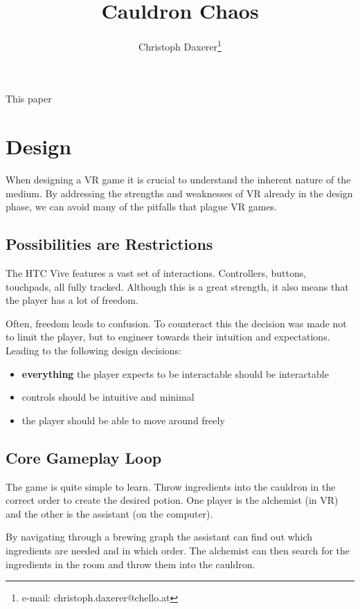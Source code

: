 \documentclass{vgtc}
\title{Cauldron Chaos}
\author{Christoph Daxerer\thanks{e-mail: christoph.daxerer@chello.at}}
\affiliation{\scriptsize Software Engineering ba. VZ FH-Oberösterreich Hagenberg}
\begin{document}

\maketitle

This paper

\section{Design}

When designing a VR game it is crucial to understand the inherent nature of the medium.
By addressing the strengths and weaknesses of VR already in the design phase, we can
avoid many of the pitfalls that plague VR games.

\subsection{Possibilities are Restrictions}

The HTC Vive features a vast set of interactions. Controllers, buttons, touchpads, all fully tracked.
Although this is a great strength, it also means that the player has a lot of freedom.

Often, freedom leads to confusion. To counteract this the decision was made not to limit the player,
but to engineer towards their intuition and expectations. Leading to the following design decisions:

\begin{itemize}
  \item \textbf{everything} the player expects to be interactable should be interactable
  \item controls should be intuitive and minimal
  \item the player should be able to move around freely
\end{itemize}

\subsection{Core Gameplay Loop}

The game is quite simple to learn. Throw ingredients into the cauldron in the correct order to create the
desired potion. One player is the alchemist (in VR) and the other is the assistant (on the computer).

By navigating through a brewing graph the assistant can find out which ingredients are needed and
in which order. The alchemist can then search for the ingredients in the room and throw them into the
cauldron.
\end{document}

